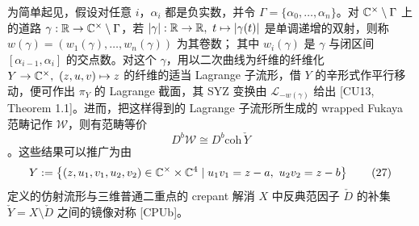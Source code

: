 为简单起见，假设对任意 $i$，$\alpha_i$ 都是负实数，并令 $\Gamma=\{\alpha_0,\dots,\alpha_n\}$。对 $\mathbb{C}^\times\setminus\Gamma$ 上的道路 $\gamma:\mathbb{R}\to\mathbb{C}^\times\setminus\Gamma$，若 $|\gamma|:\R\to\R,\ t\mapsto|\gamma(t)|$ 是单调递增的双射，则称 $w(\gamma)=(w_1(\gamma),\dots,w_n(\gamma))$ 为其卷数；
其中 $w_i(\gamma)$ 是 $\gamma$ 与闭区间 $[\alpha_{i-1},\alpha_i]$ 的交点数。对这个 $\gamma$，用以二次曲线为纤维的纤维化 $Y\to\mathbb{C}^\times,\ (z,u,v)\mapsto z$ 的纤维的适当 Lagrange 子流形，借 $Y$ 的辛形式作平行移动，便可作出 $\pi_Y$ 的 Lagrange 截面，其 SYZ 变换由 $\mathcal L_{-w(\gamma)}$ 给出 [CU13, Theorem 1.1]。进而，把这样得到的 Lagrange 子流形所生成的 wrapped Fukaya 范畴记作 $\mathcal W$，则有范畴等价
\begin{equation}
D^b\mathcal W\cong D^b\mathrm{coh}\,\check Y
\tag{26}
\end{equation}
\noindent [CU13, Theorem 1.2]。这些结果可以推广为由
\begin{equation}
Y:=\left\{(z,u_1,v_1,u_2,v_2)\in\mathbb{C}^\times\times\mathbb{C}^4\mid u_1v_1=z-a,\ u_2v_2=z-b\right\}
\tag{27}
\end{equation}
\noindent 定义的仿射流形与三维普通二重点的 crepant 解消 $X$ 中反典范因子 $\check D$ 的补集 $\check Y=X\setminus\check D$ 之间的镜像对称 [CPUb]。

